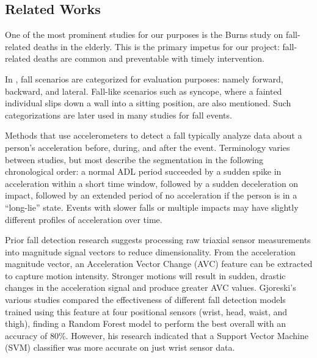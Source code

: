 \documentclass{llncs}
\begin{document}
\subsection{Related Works}
  One of the most prominent studies for our purposes is the Burns study on fall-related deaths in the elderly.\cite{burns2018deaths} This is the primary impetus for our project: fall-related deaths are common and preventable with timely intervention.
    
    In \cite{noury2007principles}, fall scenarios are categorized for evaluation purposes: namely forward, backward, and lateral. Fall-like scenarios such as syncope, where a fainted individual slips down a wall into a sitting position, are also mentioned. Such categorizations are later used in many studies for fall events.
     
    Methods that use accelerometers to detect a fall typically analyze data about a person's acceleration before, during, and after the event. Terminology varies between studies, but most describe the segmentation in the following chronological order: a normal ADL period succeeded by a sudden spike in acceleration within a short time window, followed by a sudden deceleration on impact, followed by an extended period of no acceleration if the person is in a ``long-lie'' state. Events with slower falls or multiple impacts may have slightly different profiles of acceleration over time.\cite{kangas2009sensitivity}
    
    Prior fall detection research suggests processing raw triaxial sensor measurements into magnitude signal vectors to reduce dimensionality. From the acceleration magnitude vector, an Acceleration Vector Change (AVC) feature can be extracted to capture motion intensity. Stronger motions will result in sudden, drastic changes in the acceleration signal and produce greater AVC values.\cite{gjoreski2016accurately} Gjoreski's various studies compared the effectiveness of different fall detection models trained using this feature at four positional sensors (wrist, head, waist, and thigh), finding a Random Forest model to perform the best overall with an accuracy of 80\%. However, his research indicated that a Support Vector Machine (SVM) classifier was more accurate on just wrist sensor data. 
 
\end{document}
